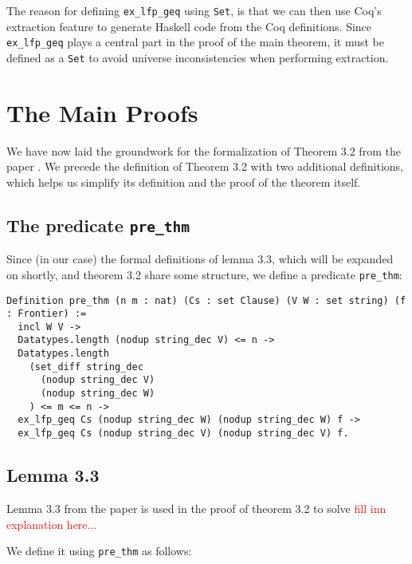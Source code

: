 The reason for defining \lstinline{ex_lfp_geq} using \lstinline{Set}, is that we can then use
Coq's extraction feature to generate Haskell code from the Coq definitions.
Since \lstinline{ex_lfp_geq} plays a central part in the proof of the main theorem,
it must be defined as a \lstinline{Set} to avoid universe inconsistencies
when performing extraction.

\section{The Main Proofs}

We have now laid the groundwork for the formalization of Theorem 3.2 from the paper \cite{mbezem}.
We precede the definition of Theorem 3.2 with two additional definitions, which helps us simplify its
definition and the proof of the theorem itself.

\subsection{The predicate \lstinline{pre_thm}}

Since (in our case) the formal definitions of lemma 3.3, which will be expanded on shortly,
and theorem 3.2 share some structure, we define a predicate \lstinline{pre_thm}:

\begin{minipage}{\linewidth}
\begin{lstlisting}[language=Coq, label={lst:pre_thm_def}, caption={Def. of \lstinline{pre_thm}}]
Definition pre_thm (n m : nat) (Cs : set Clause) (V W : set string) (f : Frontier) :=
  incl W V ->
  Datatypes.length (nodup string_dec V) <= n ->
  Datatypes.length
    (set_diff string_dec
      (nodup string_dec V)
      (nodup string_dec W)
    ) <= m <= n ->
  ex_lfp_geq Cs (nodup string_dec W) (nodup string_dec W) f ->
  ex_lfp_geq Cs (nodup string_dec V) (nodup string_dec V) f.
\end{lstlisting}
\end{minipage}

\subsection{Lemma 3.3}

Lemma 3.3 from the paper \cite{mbezem} is used in the proof of theorem 3.2 to solve \textcolor{red}{fill inn explanation here...}

We define it using \lstinline{pre_thm} as follows:

